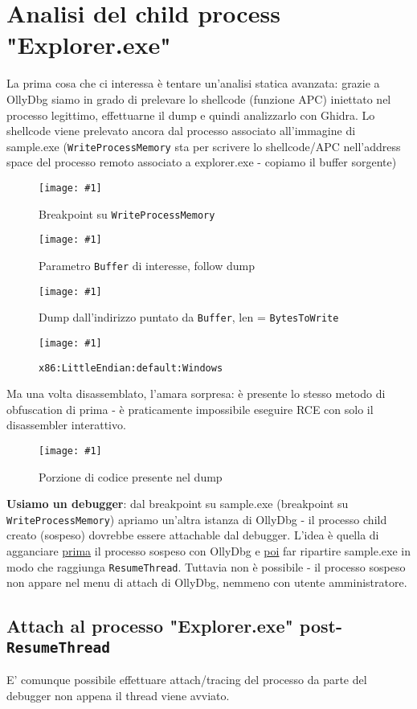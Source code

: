 \documentclass[
    a4paper, %
    11pt %
]{article}
\newcommand{\pic}[4]{\begin{figure}[H]
            \centering
            \texttt{[image: \#1]}
            \caption{#2}
            \label{fig:#1}
            \end{figure}}
\begin{document}
            \section{Analisi del child process "Explorer.exe"}

            La prima cosa che ci interessa è tentare un'analisi statica avanzata: grazie a OllyDbg siamo
            in grado di prelevare lo shellcode (funzione APC) iniettato nel processo legittimo, effettuarne il
            dump e quindi analizzarlo con Ghidra. Lo shellcode viene prelevato ancora dal processo associato all'immagine di sample.exe (\texttt{WriteProcessMemory} sta per scrivere lo shellcode/APC nell'address space del
            processo remoto associato a explorer.exe - copiamo il buffer sorgente)

            \pic{brkp_wpm}{Breakpoint su \texttt{WriteProcessMemory}}{19cm}{4cm}
            \pic{brkp_wpm_args}{Parametro \texttt{Buffer} di interesse, follow dump}{13cm}{3cm}
            \pic{brkp_wpm_dumpmem}{Dump dall'indirizzo puntato da \texttt{Buffer}, len = \texttt{BytesToWrite}}
            {14cm}{8cm}
            \pic{apccode_ghidra_import}{\texttt{x86:LittleEndian:default:Windows}}{10cm}{5cm}

            Ma una volta disassemblato, l'amara sorpresa: è presente lo stesso metodo di obfuscation di prima -
            è praticamente impossibile eseguire RCE con solo il disassembler interattivo.
            \pic{ghidra_imposs_explorer}{Porzione di codice presente nel dump}{9cm}{7cm}

            \textbf{Usiamo un debugger}: dal breakpoint su sample.exe (breakpoint su \texttt{WriteProcessMemory}) 
            apriamo un'altra istanza di OllyDbg - il processo child creato (sospeso) dovrebbe essere attachable
            dal debugger. L'idea è quella di agganciare \underline{prima} il processo sospeso con OllyDbg e \underline{poi} far ripartire sample.exe
            in modo che raggiunga \texttt{ResumeThread}. Tuttavia non è possibile - il processo sospeso non appare
            nel menu di attach di OllyDbg, nemmeno con utente amministratore.

            \subsection{Attach al processo "Explorer.exe" post-\texttt{ResumeThread}}
            E' comunque possibile effettuare attach/tracing del processo da parte del debugger non appena il thread
            viene avviato.
\end{document}
